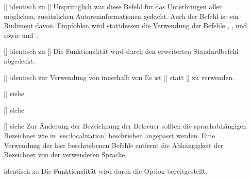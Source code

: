 \begin{Bundle*}{}
\begin{Declaration}{[]}{%
  identisch zu []%
}
\printdeclarationlist%
%
Ursprünglich war diese Befehl für das Unterbringen aller möglichen, 
zusätzlichen Autoreninformationen gedacht. Auch der Befehl  
ist ein Rudiment davon. Empfohlen wird stattdessen die Verwendung der Befehle 
, ,  und 
 sowie  und .
\end{Declaration}

\begin{Declaration}{[]}{%
  identisch zu []%
}
\printdeclarationlist%
%
Die Funktionalität wird durch den erweiterten Standardbefehl  
abgedeckt.
\end{Declaration}

\begin{Declaration}{[]}{%
  identisch zur Verwendung von  innerhalb von %
}
\printdeclarationlist%
%
Es ist []
statt [] zu verwenden.
\end{Declaration}

\begin{Declaration}{[]}{%
  siehe %
}
\begin{Declaration}{[]}{%
  siehe %
}
\begin{Declaration}{[]}{%
  siehe %
}
\printdeclarationlist%
%
Zur Änderung der Bezeichnung der Betreuer sollten die sprachabhängigen 
Bezeichner wie in \autoref{sec:localization} beschrieben angepasst werden. Eine 
Verwendung der hier beschriebenen Befehle entfernt die Abhängigkeit der 
Bezeichner von der verwendeten Sprache.
\end{Declaration}
\end{Declaration}
\end{Declaration}

\begin{Declaration}{}{%
  identisch zu %
}
\printdeclarationlist%
%
Die Funktionalität wird durch die Option  bereitgestellt.
\end{Declaration}


\end{Bundle*}
